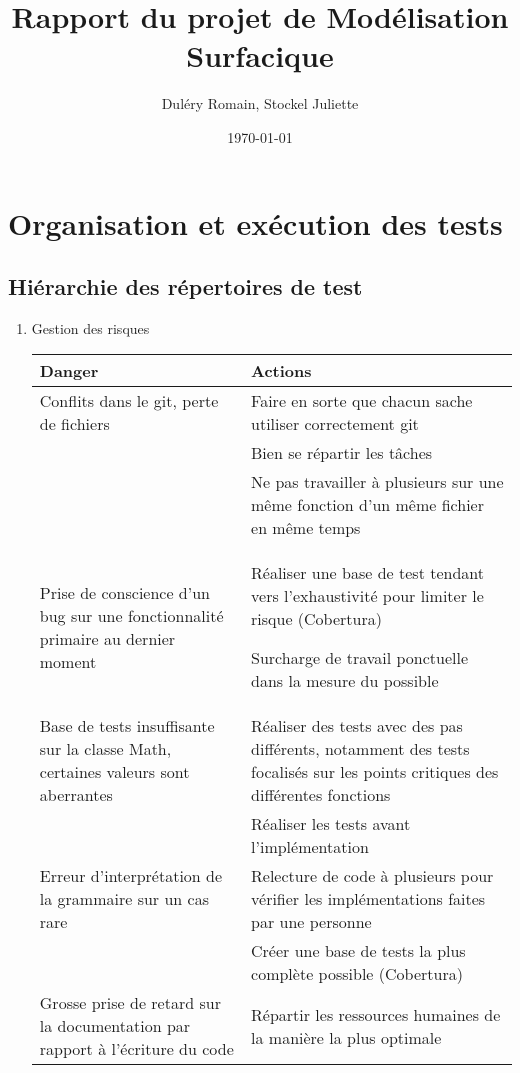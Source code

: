 \documentclass[a4paper,11pt]{article}
\title{Rapport du projet de Modélisation Surfacique}
\author{Duléry Romain, Stockel Juliette}
\date{\today}
\begin{document}
\maketitle
\vspace{1cm}

\section{Organisation et exécution des tests}
\subsection{Hiérarchie des répertoires de test}

\begin{enumerate}
\item Gestion des risques\\

\begin{center}
\begin{tabular}{p{6cm} | p{7.5cm}}
\centering \textbf{Danger} & \centering \textbf{Actions} \tabularnewline
\hline
Conflits dans le git, perte de fichiers & Faire en sorte que chacun sache utiliser correctement git \\
 & Bien se répartir les tâches\\
 & Ne pas travailler à plusieurs sur une même fonction d’un même fichier en même temps\\
\hline
Prise de conscience d'un bug sur une fonctionnalité primaire au dernier moment & Réaliser une base de test tendant vers l'exhaustivité pour limiter le risque (Cobertura)

Surcharge de travail ponctuelle dans la mesure du possible\\
\hline
Base de tests insuffisante sur la classe Math, certaines valeurs sont aberrantes & Réaliser des tests avec des pas différents, notamment des tests focalisés sur les points critiques des différentes fonctions\\
 & Réaliser les tests avant l'implémentation \\
\hline
Erreur d'interprétation de la grammaire sur un cas rare & Relecture de code à plusieurs pour vérifier les implémentations faites par une personne\\
 & Créer une base de tests la plus complète possible (Cobertura) \\
\hline
 Grosse prise de retard sur la documentation par rapport à l'écriture du code & Répartir les ressources humaines de la manière la plus optimale


\end{tabular}
\end{center}
\end{enumerate}
\end{document}
